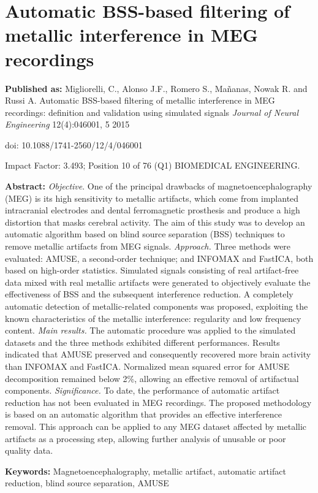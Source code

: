 \chapter{Automatic BSS-based filtering of metallic interference in MEG recordings}
\label{ch:3}
\textbf{Published as:} 
Migliorelli, C., Alonso J.F., Romero S., Ma\~nanas, Nowak R. and Russi A.
Automatic BSS-based filtering of metallic interference in MEG recordings: definition and validation using simulated signals \textit{Journal of Neural Engineering} 12(4):046001, 5 2015

doi: 10.1088/1741-2560/12/4/046001

Impact Factor: 3.493; Position 10 of 76 (Q1) BIOMEDICAL ENGINEERING.


\textbf{Abstract:} \textit{Objective}. One of the principal drawbacks of magnetoencephalography (MEG) is its high sensitivity to metallic artifacts, which come from implanted intracranial electrodes and dental ferromagnetic prosthesis and produce a high distortion that masks cerebral activity. The aim of this study was to develop an automatic algorithm based on blind source separation (BSS) techniques to remove metallic artifacts from MEG signals. \textit{Approach.} Three methods were evaluated: AMUSE, a second-order technique; and INFOMAX and FastICA, both based on high-order statistics. Simulated signals consisting of real artifact-free data mixed with real metallic artifacts were generated to objectively evaluate the effectiveness of BSS and the subsequent interference reduction. A completely automatic detection of metallic-related components was proposed, exploiting the known characteristics of the metallic interference: regularity and low frequency content. \textit{Main results.} The automatic procedure was applied to the simulated datasets and the three methods exhibited different performances. Results indicated that AMUSE preserved and consequently recovered more brain activity than INFOMAX and FastICA. Normalized mean squared error for AMUSE decomposition remained below 2\%, allowing an effective removal of artifactual components. \textit{Significance.} To date, the performance of automatic artifact reduction has not been evaluated in MEG recordings. The proposed methodology is based on an automatic algorithm that provides an effective interference removal. This approach can be applied to any MEG dataset affected by metallic artifacts as a processing step, allowing further analysis of unusable or poor quality data.

\textbf{Keywords:} Magnetoencephalography, metallic artifact, automatic artifact reduction, blind source separation, AMUSE


